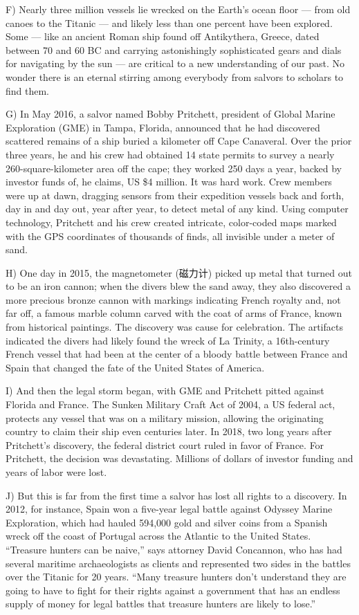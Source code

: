\documentclass[UTF8,11pt]{ctexart}
\begin{document}
F) Nearly three million vessels lie wrecked on the Earth’s ocean floor — from old canoes to the Titanic — and likely less than one percent have been explored. Some — like an ancient Roman ship found off Antikythera, Greece, dated between 70 and 60 BC and carrying astonishingly sophisticated gears and dials for navigating by the sun — are critical to a new understanding of our past. No wonder there is an eternal stirring among everybody from salvors to scholars to find them.


G) In May 2016, a salvor named Bobby Pritchett, president of Global Marine Exploration (GME) in Tampa, Florida, announced that he had discovered scattered remains of a ship buried a kilometer off Cape Canaveral. Over the prior three years, he and his crew had obtained 14 state permits to survey a nearly 260-square-kilometer area off the cape; they worked 250 days a year, backed by investor funds of, he claims, US \$4 million. It was hard work. Crew members were up at dawn, dragging sensors from their expedition vessels back and forth, day in and day out, year after year, to detect metal of any kind. Using computer technology, Pritchett and his crew created intricate, color-coded maps marked with the GPS coordinates of thousands of finds, all invisible under a meter of sand.


H) One day in 2015, the magnetometer (磁力计) picked up metal that turned out to be an iron cannon; when the divers blew the sand away, they also discovered a more precious bronze cannon with markings indicating French royalty and, not far off, a famous marble column carved with the coat of arms of France, known from historical paintings. The discovery was cause for celebration. The artifacts indicated the divers had likely found the wreck of La Trinity, a 16th-century French vessel that had been at the center of a bloody battle between France and Spain that changed the fate of the United States of America.


I) And then the legal storm began, with GME and Pritchett pitted against Florida and France. The Sunken Military Craft Act of 2004, a US federal act, protects any vessel that was on a military mission, allowing the originating country to claim their ship even centuries later. In 2018, two long years after Pritchett’s discovery, the federal district court ruled in favor of France. For Pritchett, the decision was devastating. Millions of dollars of investor funding and years of labor were lost.


J) But this is far from the first time a salvor has lost all rights to a discovery. In 2012, for instance, Spain won a five-year legal battle against Odyssey Marine Exploration, which had hauled 594,000 gold and silver coins from a Spanish wreck off the coast of Portugal across the Atlantic to the United States. “Treasure hunters can be naive,” says attorney David Concannon, who has had several maritime archaeologists as clients and represented two sides in the battles over the Titanic for 20 years. “Many treasure hunters don’t understand they are going to have to fight for their rights against a government that has an endless supply of money for legal battles that treasure hunters are likely to lose.”
\end{document}
